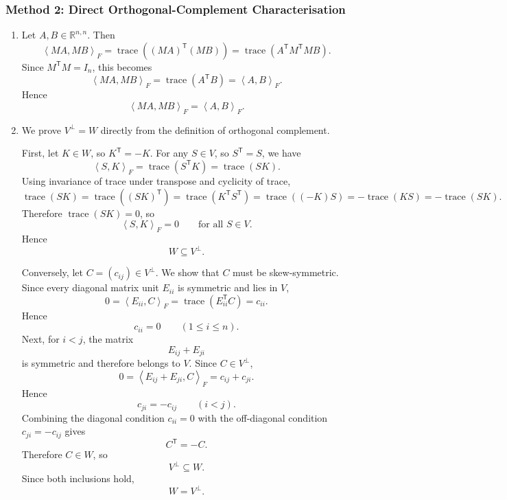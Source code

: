 \documentclass[12pt]{article}
\newcommand{\R}{\mathbb{R}}
\newcommand{\tr}{\operatorname{trace}}
\newcommand{\ipF}[2]{\left\langle #1,#2\right\rangle_F}
\newcommand{\T}{\mathsf{T}}
\begin{document}
\subsubsection{Method 2: Direct Orthogonal-Complement Characterisation}
\begin{enumerate}[label=(\alph*)]
  \item Let $A,B\in\R^{n,n}$. Then
  \[
    \ipF{MA}{MB}
    =
    \tr((MA)^\T(MB))
    =
    \tr(A^\T M^\T M B).
  \]
  Since $M^\T M=I_n$, this becomes
  \[
    \ipF{MA}{MB}
    =
    \tr(A^\T B)
    =
    \ipF{A}{B}.
  \]
  Hence
  \[
    \boxed{\ipF{MA}{MB}=\ipF{A}{B}.}
  \]

  \item We prove $V^\perp=W$ directly from the definition of orthogonal complement.

  First, let $K\in W$, so $K^\T=-K$. For any $S\in V$, so $S^\T=S$, we have
  \[
    \ipF{S}{K}
    =
    \tr(S^\T K)
    =
    \tr(SK).
  \]
  Using invariance of trace under transpose and cyclicity of trace,
  \[
    \tr(SK)
    =
    \tr((SK)^\T)
    =
    \tr(K^\T S^\T)
    =
    \tr((-K)S)
    =
    -\tr(KS)
    =
    -\tr(SK).
  \]
  Therefore $\tr(SK)=0$, so
  \[
    \ipF{S}{K}=0
    \qquad\text{for all }S\in V.
  \]
  Hence
  \[
    W\subseteq V^\perp.
  \]

  Conversely, let $C=(c_{ij})\in V^\perp$. We show that $C$ must be skew-symmetric. Since every diagonal matrix unit $E_{ii}$ is symmetric and lies in $V$,
  \[
    0=\ipF{E_{ii}}{C}=\tr(E_{ii}^\T C)=c_{ii}.
  \]
  Hence
  \[
    c_{ii}=0
    \qquad(1\le i\le n).
  \]
  Next, for $i<j$, the matrix
  \[
    E_{ij}+E_{ji}
  \]
  is symmetric and therefore belongs to $V$. Since $C\in V^\perp$,
  \[
    0
    =
    \ipF{E_{ij}+E_{ji}}{C}
    =
    c_{ij}+c_{ji}.
  \]
  Hence
  \[
    c_{ji}=-c_{ij}
    \qquad(i<j).
  \]
  Combining the diagonal condition $c_{ii}=0$ with the off-diagonal condition $c_{ji}=-c_{ij}$ gives
  \[
    C^\T=-C.
  \]
  Therefore $C\in W$, so
  \[
    V^\perp\subseteq W.
  \]
  Since both inclusions hold,
  \[
    \boxed{W=V^\perp.}
  \]
\end{enumerate}

\newpage
\end{document}
